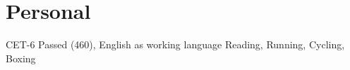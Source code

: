 \documentclass[utf8]{twentysecondcv} %
\begin{document}
\section{Personal}

%
%        

\vspace{3pt}
\begin{twentyshort}
    \twentyitemshort
        {CET-6 Passed (460), English as working language}
        {}
	\twentyitemshort
        {Reading, Running, Cycling, Boxing}
        {}
\end{twentyshort}
\end{document}
